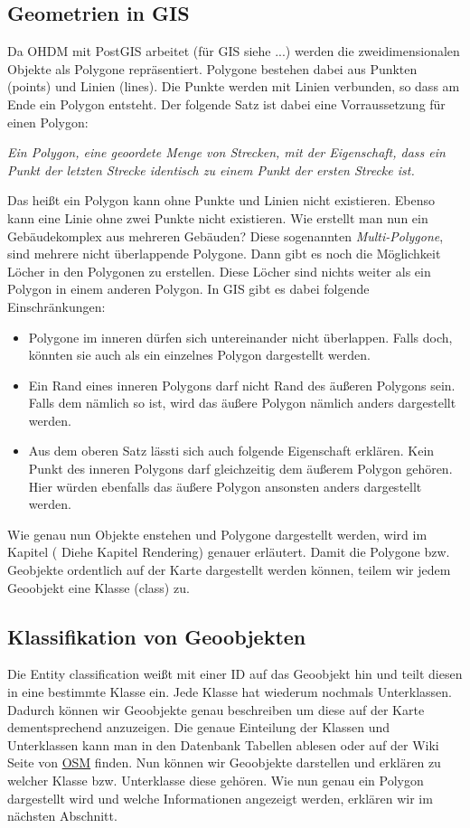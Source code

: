 \subsection{Geometrien in GIS}
Da OHDM mit PostGIS arbeitet (für GIS siehe ...) werden die zweidimensionalen Objekte als Polygone repräsentiert. Polygone bestehen dabei aus Punkten (points) und Linien (lines). Die Punkte werden mit Linien verbunden, so dass am Ende ein Polygon entsteht. Der folgende Satz ist dabei eine Vorraussetzung für einen Polygon:
\begin{center}
 \textit{Ein Polygon, eine geoordete Menge von Strecken, mit der Eigenschaft, dass ein Punkt der letzten Strecke identisch zu einem Punkt der ersten Strecke ist.}
 \end{center} 
Das heißt ein Polygon kann ohne Punkte und Linien nicht existieren. Ebenso kann eine Linie ohne zwei Punkte nicht existieren. Wie erstellt man nun ein Gebäudekomplex aus mehreren Gebäuden? Diese sogenannten \textit{Multi-Polygone}, sind mehrere nicht überlappende Polygone. Dann gibt es noch die Möglichkeit Löcher in den Polygonen zu erstellen. Diese Löcher sind nichts weiter als ein Polygon in einem anderen Polygon. In GIS gibt es dabei folgende Einschränkungen:
\begin{itemize}
\item Polygone im inneren dürfen sich untereinander nicht überlappen. Falls doch, könnten sie auch als ein einzelnes Polygon dargestellt werden.
\item Ein Rand eines inneren Polygons darf nicht Rand des äußeren Polygons sein. Falls dem nämlich so ist, wird das äußere Polygon nämlich anders dargestellt werden.
\item Aus dem oberen Satz lässti sich auch folgende Eigenschaft erklären. Kein Punkt des inneren Polygons darf gleichzeitig dem äußerem Polygon gehören. Hier würden ebenfalls das äußere Polygon ansonsten anders dargestellt werden. 
\end{itemize}
Wie genau nun Objekte enstehen und Polygone dargestellt werden, wird im Kapitel ( Diehe Kapitel Rendering) genauer erläutert. Damit die Polygone bzw. Geobjekte ordentlich auf der Karte dargestellt werden können, teilem wir jedem Geoobjekt eine Klasse (class) zu. 

\subsection{Klassifikation von Geoobjekten}
Die Entity classification weißt mit einer ID auf das Geoobjekt hin und teilt diesen in eine bestimmte Klasse ein. Jede Klasse hat wiederum nochmals Unterklassen. Dadurch können wir Geoobjekte genau beschreiben um diese auf der Karte dementsprechend anzuzeigen. Die genaue Einteilung der Klassen und Unterklassen kann man in den Datenbank Tabellen ablesen oder auf der Wiki Seite von \href{http://wiki.openstreetmap.org/wiki/Map_Features#Building}{OSM} finden. 
Nun können wir Geoobjekte darstellen und erklären zu welcher Klasse bzw. Unterklasse diese gehören. Wie nun genau ein Polygon dargestellt wird und welche Informationen angezeigt werden, erklären wir im nächsten Abschnitt.

